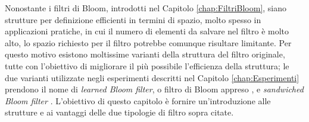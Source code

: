 \documentclass[../../main.tex]{subfiles}
\begin{document}
    Nonostante i filtri di Bloom, introdotti nel Capitolo \ref{chap:FiltriBloom}, siano strutture per definizione efficienti in termini di spazio, molto spesso in applicazioni pratiche, in cui il numero di elementi da salvare nel filtro è molto alto, lo spazio richiesto per il filtro potrebbe comunque risultare limitante. Per questo motivo esistono moltissime varianti della struttura del filtro originale, tutte con l'obiettivo di migliorare il più possibile l'efficienza della struttura; le due varianti utilizzate negli esperimenti descritti nel Capitolo \ref{chap:Esperimenti} prendono il nome di \textit{learned Bloom filter}, o filtro di Bloom appreso \cite{kraska2018case}, e \textit{sandwiched Bloom filter} \cite{10.5555/3326943.3326986}. L'obiettivo di questo capitolo è fornire un'introduzione alle strutture e ai vantaggi delle due tipologie di filtro sopra citate.
\end{document}
